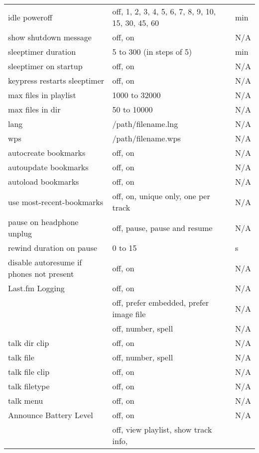 \begin{center}
\begin{longtable}{>{\raggedright}p{}>{\raggedright}p{}p{}}
    idle poweroff   & off, 1, 2, 3, 4, 5, 6, 7, 8, 9, 10, 15, 30, 45, 60
                                        & min\\
    show shutdown message & off, on     & N/A\\
    sleeptimer duration   & 5 to 300 (in steps of 5)
                                        & min\\
    sleeptimer on startup & off, on     & N/A\\
    keypress restarts sleeptimer & off, on & N/A\\
    max files in playlist & 1000 to 32000 & N/A\\
    max files in dir & 50 to 10000       & N/A\\
    lang            & /path/filename.lng & N/A\\
    wps             & /path/filename.wps & N/A\\
    autocreate bookmarks
                    & off, on           & N/A\\
    autoupdate bookmarks
                    & off, on           & N/A\\
    autoload bookmarks
                    & off, on           & N/A\\
    use most-recent-bookmarks
                    & off, on, unique only, one per track & N/A\\
    pause on headphone unplug & off, pause, pause and resume & N/A\\
    rewind duration on pause & 0 to 15  & s\\
    disable autoresume if phones not present & off, on & N/A\\
    Last.fm Logging & off, on           & N/A\\
    \opt{albumart}{
    album art
                    & off, prefer embedded, prefer image file & N/A\\
    }
    talk dir        & off, number, spell& N/A\\
    talk dir clip   & off, on           & N/A\\
    talk file       & off, number, spell& N/A\\
    talk file clip  & off, on           & N/A\\
    talk filetype   & off, on           & N/A\\
    talk menu       & off, on           & N/A\\
    Announce Battery Level & off, on    & N/A\\
    \opt{hotkey}{
    hotkey wps      & off, view playlist, show track info,
}
\end{longtable}
\end{center}
